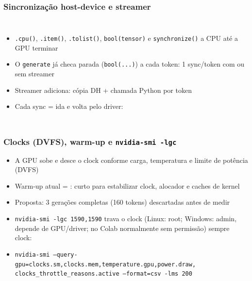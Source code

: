 \documentclass[11pt, aspectratio=169, usepdftitle=false]{beamer}
\begin{document}
\begin{frame}
\frametitle{Sincronização host-device e streamer}
\begin{columns}[T]
\begin{itemize}
\item \texttt{.cpu()}, \texttt{.item()}, \texttt{.tolist()}, \texttt{bool(tensor)} e \texttt{synchronize()}  a CPU até a GPU terminar
\item O \texttt{generate} já checa parada (\texttt{bool(...)}) a cada token: 1 sync/token com ou sem streamer
\item Streamer adiciona: cópia D\so H + chamada Python por token
\item Cada sync = ida e volta pelo driver: 
\end{itemize}
\end{columns}
\end{frame}

\begin{frame}
\frametitle{Clocks (DVFS), warm-up e \texttt{nvidia-smi -lgc}}
\begin{itemize}
\item A GPU sobe e desce o clock conforme carga, temperatura e limite de potência (DVFS)
\item Warm-up atual = : curto para estabilizar clock, alocador e caches de kernel
\item Proposta: 3 gerações completas (160 tokens) descartadas antes de medir
\item \texttt{nvidia-smi -lgc 1590,1590} trava o clock (Linux: root; Windows: admin, depende de GPU/driver; no Colab normalmente sem permissão) \so sempre  clock:
\item[] \texttt{nvidia-smi --query-gpu=clocks.sm,clocks.mem,temperature.gpu,power.draw,} \texttt{clocks\_throttle\_reasons.active --format=csv -lms 200}
\end{itemize}
\end{frame}
\end{document}
